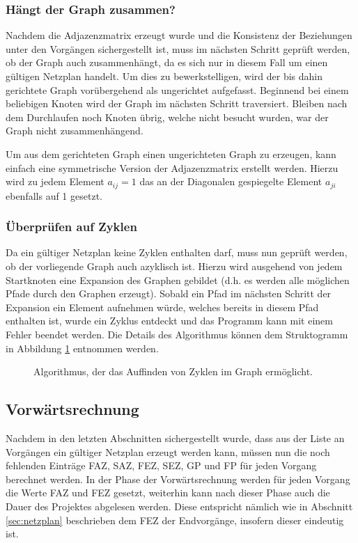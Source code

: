 \subsubsection{H\"angt der Graph zusammen?}

Nachdem die Adjazenzmatrix erzeugt wurde und die Konsistenz der
Beziehungen unter den Vorg\"angen sichergestellt ist, muss im
n\"achsten Schritt gepr\"uft werden, ob der Graph auch
zusammenh\"angt, da es sich nur in diesem Fall um einen g\"ultigen
Netzplan handelt. Um dies zu bewerkstelligen, wird der bis dahin
gerichtete Graph vor\"ubergehend als ungerichtet aufgefasst. Beginnend
bei einem beliebigen Knoten wird der Graph im n\"achsten Schritt
traversiert. Bleiben nach dem Durchlaufen noch Knoten \"ubrig, welche
nicht besucht wurden, war der Graph nicht zusammenh\"angend.

Um aus dem gerichteten Graph einen ungerichteten Graph zu erzeugen,
kann einfach eine symmetrische Version der Adjazenzmatrix erstellt
werden. Hierzu wird zu jedem Element \(a_{ij}=1\) das an der
Diagonalen gespiegelte Element \(a_{ji}\) ebenfalls auf 1 gesetzt.

\subsubsection{\"Uberpr\"ufen auf Zyklen}

Da ein g\"ultiger Netzplan keine Zyklen enthalten darf, muss nun
gepr\"uft werden, ob der vorliegende Graph auch azyklisch ist. Hierzu
wird ausgehend von jedem Startknoten eine Expansion des Graphen
gebildet (d.h. es werden alle m\"oglichen Pfade durch den Graphen erzeugt).
Sobald ein Pfad im n\"achsten Schritt der Expansion ein Element
aufnehmen w\"urde, welches bereits in diesem Pfad enthalten ist, wurde
ein Zyklus entdeckt und das Programm kann mit einem Fehler beendet
werden. Die Details des
Algorithmus k\"onnen dem Struktogramm in Abbildung \ref{zyklenfinden}
entnommen werden.

\begin{figure}
  
  \caption{Algorithmus, der das Auffinden von Zyklen im Graph erm\"oglicht.}
  \label{zyklenfinden}
\end{figure}

\subsection{Vorw\"artsrechnung}

Nachdem in den letzten Abschnitten sichergestellt wurde, dass aus der
Liste an Vorg\"angen ein g\"ultiger Netzplan erzeugt werden kann,
m\"ussen nun die noch fehlenden Eintr\"age FAZ, SAZ, FEZ, SEZ, GP und
FP f\"ur jeden Vorgang berechnet werden. In der Phase der
Vorw\"artsrechnung werden f\"ur jeden Vorgang die Werte FAZ und FEZ
gesetzt, weiterhin kann nach dieser Phase auch die Dauer des Projektes
abgelesen werden. Diese entspricht n\"amlich wie in Abschnitt
\ref{sec:netzplan} beschrieben dem FEZ der Endvorg\"ange, insofern
dieser eindeutig ist.

